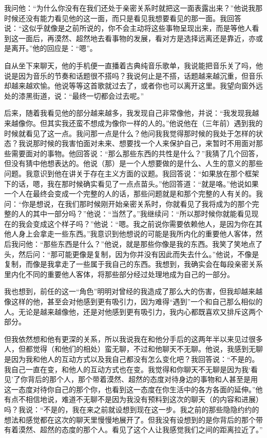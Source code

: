 我问他：“为什么你没有在我们还处于亲密关系时就把这一面表露出来？”他说我那时候还没有能力看见他的这一面，而只是看见我想要看见的那一面。我回答说：“这似乎就像是之前所说的，你不会主动将这些事物呈现出来，而是等他人看到这一面后，再漠然、超然地去看事物的发展，看对方是选择远离还是靠近，亦或是离开。”他的回应是：“嗯”。

自从坐下来聊天，他的手机便一直播着古典纯音乐歌单，我说能把音乐关了吗，他说是因为音乐的节奏和话题很不搭吗？我说何止是不搭，话题越来越沉重，但音乐却越来越欢愉。他说等等这首歌就过去了，或者你也可以离开这里。我望向窗外远处的漆黑街道，说：“最终一切都会过去呢。”


后来，随着我看见他的部分越来越多，我发现自己非常像他，并说：“我发现我越来越像你。但其实我还蛮不想成为像你一样的人的。”他说他在（三年前）遇到我的时候就看见了这一点。我问那一点是什么？他问我我觉得那时候的我处于怎样的状态？我说那时候的我害怕面对未来、想要找一个人来保护自己，来暂时不用面对那些需要面对的事物。他回答说：“那么那些东西的共性是什么？”我猜了几个回答，但没有猜中他想表达的。他说（那）是一个人想要做的是什么、人生的意义的那些问题。我意识到他在讲关于存在主义方面的议题。我回答说：“如果放在那个框架下的话，嗯，我在那时候确实看见了一点点苗头。”他回答道：“就是咯。”他说如果一个人在最终会变成一个完整的人的话，那些问题就是和那个完整的人有关的。我问：“你是想说，在我们那时候刚开始亲密关系时，你就看见了我将成为的那个完整的人的其中一部分吗？”他说：“当然了。”我继续问：“所以那时候你就能看见现在的我会变成这个样子吗？”他说：“嗯。我之前说你需要依赖他人，是因为你在其他人身上会拿走一些东西。”我意识到他想说的可能是我所内化的重要他人客体，然后我问他：“那些东西是什么？”他说，就是那些你像是我的东西。我笑了笑地点了头，然后问：“那可能更像是复制，因为你并没有因此而失去什么。”他说，不像是复制，而像是我拿走了一些属于我自己的东西。我想到，我确实会在每段亲密关系里内化不同的重要他人客体，将那些部分经过处理地成为自己的一部分。

我也想到，前任的这一“角色”明明对曾经的我造成了那么大的伤害，但我却越来越像这样的他，甚至会对他感到更有吸引力，因为难得“遇到”一个和自己那么相似的人。无论是越来越像他，还是对他感到更有吸引力，我内心都既喜欢又排斥这两个部分。

但我依然想和他有更深的关系，所以我说我在和他分手后的这两年半以来见过很多人，但都觉得（和他们的相处）蛮无聊，不过和他聊天不无聊。他说，我感到无聊是因为我和他人的互动方式以及我自己都没有怎么变化吧？我回答说：“不是的。我自己一直在变，和他人的互动方式也在变。我觉得和你聊天不无聊是因为我‘看见’了你背后的那个人，那个带着漠然、超然的态度对待身边的事物和人甚至是用这一态度对待你自己的那个你，也看到这一态度在你生活中的各方各面的延伸。”他有点不相信地说，难道不无聊不是因为我没有预料到这次的聊天（的内容和进展）吗？我说：“不是的，我在来之前就设想到现在这一步。我之前的那些隐隐约约的想法和感觉都在这次的聊天里慢慢地展开了。但我没有设想到的是你背后的那个带有着漠然、超然的态度的那个人。看见了这个人让我感觉我们之间的距离拉近了。”

